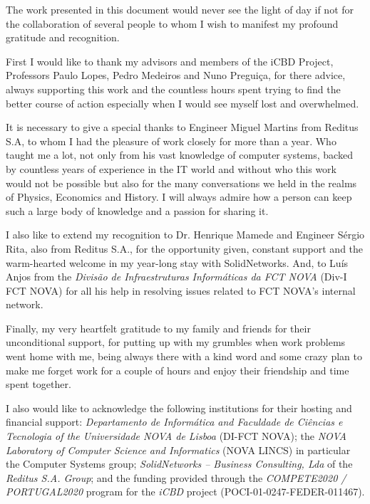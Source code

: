 \acknowledgements

The work presented in this document would never see the light of day if not for the collaboration of several people to whom I wish to manifest my profound gratitude and recognition. 

First I would like to thank my advisors and members of the iCBD Project, Professors Paulo Lopes, Pedro Medeiros and Nuno Preguiça, for there advice, always supporting this work and the countless hours spent trying to find the better course of action especially when I would see myself lost and overwhelmed.

It is necessary to give a special thanks to Engineer Miguel Martins from Reditus S.A, to whom I had the pleasure of work closely for more than a year. Who taught me a lot, not only from his vast knowledge of computer systems, backed by countless years of experience in the IT world and without who this work would not be possible but also for the many conversations we held in the realms of Physics, Economics and History. I will always admire how a person can keep such a large body of knowledge and a passion for sharing it.

I also like to extend my recognition to Dr. Henrique Mamede and Engineer Sérgio Rita, also from Reditus S.A., for the opportunity given, constant support and the warm-hearted welcome in my year-long stay with SolidNetworks. And, to Luís Anjos from the \textit{Divisão de Infraestruturas Informáticas da FCT NOVA} (Div-I FCT NOVA) for all his help in resolving issues related to FCT NOVA's internal network.

Finally, my very heartfelt gratitude to my family and friends for their unconditional support, for putting up with my grumbles when work problems went home with me, being always there with a kind word and some crazy plan to make me forget work for a couple of hours and enjoy their friendship and time spent together.

I also would like to acknowledge the following institutions for their hosting and financial support: \textit{Departamento de Informática and Faculdade de Ciências e Tecnologia of the Universidade NOVA de Lisboa} (DI-FCT NOVA); the \textit{NOVA Laboratory of Computer Science and Informatics} (NOVA LINCS) in particular the Computer Systems group; \textit{SolidNetworks – Business Consulting, Lda} of the \textit{Reditus S.A. Group}; and the funding provided through the \textit{COMPETE2020 / PORTUGAL2020} program for the \textit{iCBD} project (POCI-01-0247-FEDER-011467).